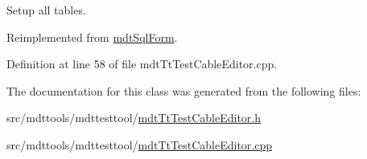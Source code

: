 Setup all tables. 



Reimplemented from \hyperlink{classmdt_sql_form_a27fe6e45aa5d4d7782aad9833e6de20b}{mdt\-Sql\-Form}.



Definition at line 58 of file mdt\-Tt\-Test\-Cable\-Editor.\-cpp.



The documentation for this class was generated from the following files\-:\begin{DoxyCompactItemize}
\item 
src/mdttools/mdttesttool/\hyperlink{mdt_tt_test_cable_editor_8h}{mdt\-Tt\-Test\-Cable\-Editor.\-h}\item 
src/mdttools/mdttesttool/\hyperlink{mdt_tt_test_cable_editor_8cpp}{mdt\-Tt\-Test\-Cable\-Editor.\-cpp}\end{DoxyCompactItemize}
